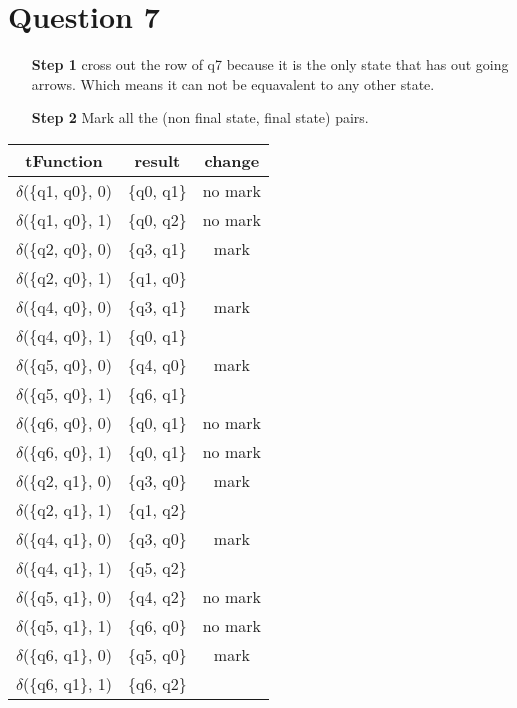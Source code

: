 \documentclass[a4paper, 12pt]{article}
\begin{document}
\section*{Question 7}
\begin{itemize}
\item[\textbf{Step 1}] cross out the row of q7 because it is the only state that has out going arrows. Which means it can not be equavalent to any other state.
\item[\textbf{Step 2}] Mark all the (non final state, final state) pairs.

\end{itemize}
\begin{table}[h!t]
\begin{tabular}{c|c|c}
\hline
   tFunction& result & change\\
 \hline
 $\delta$(\{q1, q0\}, 0) & \{q0, q1\} &  no mark \\
 $\delta$(\{q1, q0\}, 1) & \{q0, q2\} &  no mark \\
 \hline
 $\delta$(\{q2, q0\}, 0) & \{q3, q1\} &  mark \\
 $\delta$(\{q2, q0\}, 1) & \{q1, q0\} &   \\
 \hline
 $\delta$(\{q4, q0\}, 0) & \{q3, q1\} &  mark \\
 $\delta$(\{q4, q0\}, 1) & \{q0, q1\} &   \\
 \hline
 $\delta$(\{q5, q0\}, 0) & \{q4, q0\} &  mark \\
 $\delta$(\{q5, q0\}, 1) & \{q6, q1\} &  \\
 \hline
 $\delta$(\{q6, q0\}, 0) & \{q0, q1\} &  no mark \\
 $\delta$(\{q6, q0\}, 1) & \{q0, q1\} &  no mark \\
 
 \hline
 $\delta$(\{q2, q1\}, 0) & \{q3, q0\} &  mark \\
 $\delta$(\{q2, q1\}, 1) & \{q1, q2\} &  \\
 \hline
 $\delta$(\{q4, q1\}, 0) & \{q3, q0\} &  mark \\
 $\delta$(\{q4, q1\}, 1) & \{q5, q2\} &   \\
 \hline
 $\delta$(\{q5, q1\}, 0) & \{q4, q2\} & no mark \\
 $\delta$(\{q5, q1\}, 1) & \{q6, q0\} & no mark \\
 \hline
 $\delta$(\{q6, q1\}, 0) & \{q5, q0\} &  mark \\
 $\delta$(\{q6, q1\}, 1) & \{q6, q2\} &  \\
 

\end{tabular}
\end{table}
\end{document}
